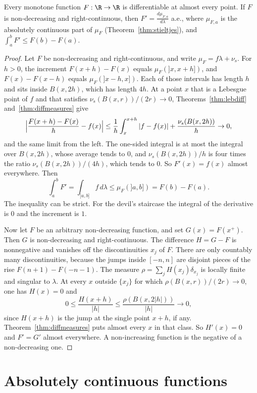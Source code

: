 \begin{theorem}[Lebesgue, 1904]\label{thm:monotone}
Every monotone function $F:\R\to\R$ is differentiable at almost every point. If $F$ is non-decreasing and right-continuous, then $F'=\frac{d\mu_{F,a}}{d\lambda}$ a.e., where $\mu_{F,a}$ is the absolutely continuous part of
$\mu_F$ (Theorem~\ref{thm:stieltjes}), and $\int_a^bF'\le F(b)-F(a)$.
\end{theorem}
\begin{proof}
Let $F$ be non-decreasing and right-continuous, and write $\mu_F=f\lambda+\nu_s$. For $h>0$, the increment $F(x+h)-F(x)$ equals $\mu_F(]x,x+h])$, and $F(x)-F(x-h)$ equals $\mu_F(]x-h,x])$. Each of those intervals has length $h$ and sits inside $B(x,2h)$, which has length $4h$. At a point $x$ that is a Lebesgue point of $f$ and that satisfies $\nu_s(B(x,r))/(2r)\to0$, Theorems~\ref{thm:lebdiff} and~\ref{thm:diffmeasures} give
\[
\Bigl|\frac{F(x+h)-F(x)}h-f(x)\Bigr|\le\frac1h\int_x^{x+h}|f-f(x)|+\frac{\nu_s(B(x,2h))}h\to0,
\]
and the same limit from the left. The one-sided integral is at most the integral over $B(x,2h)$, whose average tends to $0$, and $\nu_s(B(x,2h))/h$ is four times the ratio $\nu_s(B(x,2h))/(4h)$, which tends to $0$. So $F'(x)=f(x)$ almost everywhere. Then
\[
\int_a^bF'=\int_{]a,b]}f\,d\lambda\le\mu_F(]a,b])=F(b)-F(a).
\]
The inequality can be strict. For the devil's staircase the integral of the derivative is $0$ and the increment is $1$.

Now let $F$ be an arbitrary non-decreasing function, and set $G(x)=F(x^+)$. Then $G$ is non-decreasing and right-continuous. The difference $H=G-F$ is nonnegative and vanishes off the discontinuities $x_j$ of $F$. There are only countably many discontinuities, because the jumps inside $[-n,n]$ are disjoint pieces of the rise $F(n+1)-F(-n-1)$. The measure $\rho=\sum_jH(x_j)\delta_{x_j}$ is locally finite and singular to $\lambda$. At every $x$ outside $\{x_j\}$ for which $\rho(B(x,r))/(2r)\to0$, one has $H(x)=0$ and
\[
0\le\frac{H(x+h)}{|h|}\le\frac{\rho(B(x,2|h|))}{|h|}\to0,
\]
since $H(x+h)$ is the jump at the single point $x+h$, if any. Theorem~\ref{thm:diffmeasures} puts almost every $x$ in that class. So $H'(x)=0$ and $F'=G'$ almost everywhere. A non-increasing function is the negative of a non-decreasing one.
\end{proof}

\section{Absolutely continuous functions}


